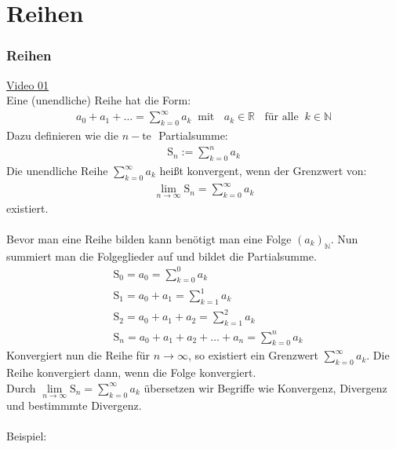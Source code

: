 
\chapter{Reihen}
\setcounter{section}{13}
\setcounter{subsection}{0}
\setcounter{subsubsection}{-1}
\setcounter{secnumdepth}{4}
\subsection{Reihen}
\href{https://youtu.be/-YXCVGfMCcQ}{Video 01}\\
Eine (unendliche) Reihe hat die Form:\\
\begin{align*}
a_0+a_1+\ldots=\sum\limits_{k=0}^{\infty}a_k\;\;\text{mit }\;\;a_k\in\mathbb{R}\;\;\text{ für alle}\;\;k\in\mathbb{N}
\end{align*}
Dazu definieren wie die $ n-\text{te } $ Partialsumme:\\
\begin{align*}
\mathrm{S}_n:=\sum\limits_{k=0}^{n}a_k
\end{align*}
Die unendliche Reihe $ \sum\limits_{k=0}^{\infty}a_k $ heißt konvergent, wenn der Grenzwert von:\\
\begin{align*}
\lim\limits_ {n\to\infty}\mathrm{S}_n=\sum\limits_{k=0}^{\infty}a_k
\end{align*}
existiert.\\
\\
Bevor man eine Reihe bilden kann benötigt man eine Folge $ (a_k)_{\mathbb{N}} $. Nun summiert man die Folgeglieder auf und bildet die Partialsumme.\\
\begin{align*}
&\mathrm{S}_0=a_0=\sum\limits_{k=0}^{0}a_k\\
&\mathrm{S}_1=a_0+a_1=\sum\limits_{k=1}^{1}a_k\\
&\mathrm{S}_2=a_0+a_1+a_2=\sum\limits_{k=1}^{2}a_k\\
&\mathrm{S}_n=a_0+a_1+a_2+\ldots+a_n=\sum\limits_{k=0}^{n}a_k
\end{align*}
Konvergiert nun die Reihe für $ n\rightarrow\infty $, so existiert ein  Grenzwert $ \sum\limits_{k=0}^{\infty} a_k$. Die Reihe konvergiert dann, wenn die Folge konvergiert.\\
Durch $ \lim\limits_ {n\to\infty}\mathrm{S}_n=\sum\limits_{k=0}^{\infty} a_k$ übersetzen wir Begriffe wie Konvergenz, Divergenz und bestimmmte Divergenz.\\
\\
Beispiel:\\
